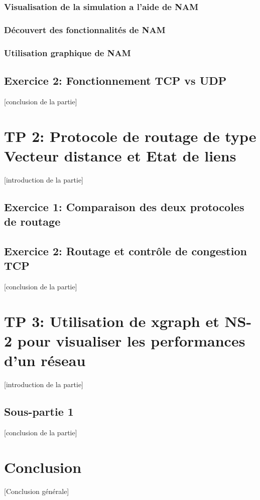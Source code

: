 \documentclass[11pt]{article}
\begin{document}
\subsubsection{Visualisation de la simulation a l'aide de NAM}

\subsubsection{Découvert des fonctionnalités de NAM}

\subsubsection{Utilisation graphique de NAM}


\subsection{Exercice 2: Fonctionnement TCP vs UDP}



[conclusion de la partie]



\section{TP 2: Protocole de routage de type Vecteur distance et Etat de liens}
[introduction de la partie]

\subsection{Exercice 1: Comparaison des deux protocoles de routage}


\subsection{Exercice 2: Routage et contrôle de congestion TCP}

[conclusion de la partie]

\section{TP 3: Utilisation de xgraph et NS-2 pour visualiser les performances d'un réseau}
[introduction de la partie]

\subsection{Sous-partie 1}

[conclusion de la partie]




\section*{Conclusion}
[Conclusion générale]
\end{document}
